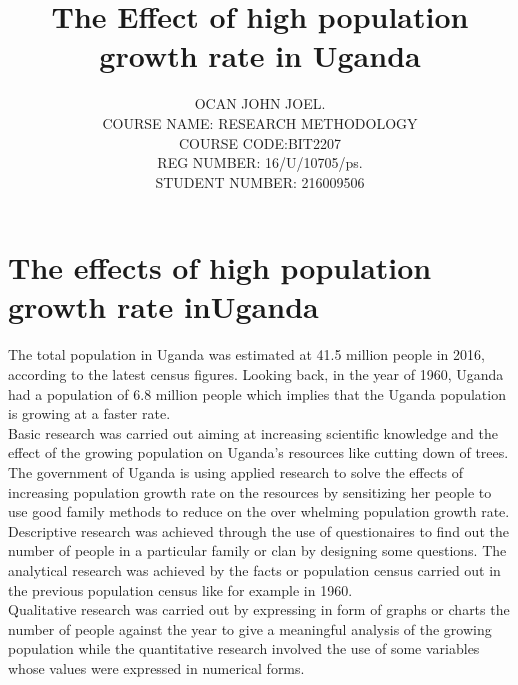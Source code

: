 \documentclass[12pt,a4paper]{article}
\begin{document}
\title{The Effect of high population growth rate in Uganda}
\author{OCAN JOHN JOEL.\\
COURSE NAME: RESEARCH METHODOLOGY\\
   COURSE CODE:BIT2207\\
    REG NUMBER: 16/U/10705/ps.\\
      STUDENT NUMBER: 216009506\\}
\maketitle   
\section{The effects of high population growth rate inUganda}
    The total population in Uganda was estimated at 41.5 million people in 2016, according to the latest census figures. Looking back, in the year of 1960, Uganda had a population of 6.8 million people which implies that the Uganda population is growing at a faster rate. \\
    Basic research was carried out aiming at increasing scientific knowledge and the effect of the growing population on Uganda's resources like cutting down of trees.\\
    The government of Uganda is using applied research to solve the effects of increasing population growth rate on the resources by sensitizing her people to use good family methods to reduce on the over whelming population growth rate.\\
    
    Descriptive research was achieved through the use of questionaires to find out the number of people in a particular family or clan by designing some questions. The analytical research was achieved by the facts or population census carried out in the previous population census like for example in 1960.\\
Qualitative research was carried out by expressing in form of graphs or charts the number of people against the year to give a meaningful analysis of the growing population while the quantitative research involved the use of some variables whose values were expressed in numerical forms.
    
    
    
    
    
    
\end{document}
